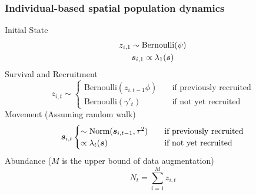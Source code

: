 \documentclass[color=usenames,dvipsnames]{beamer}\usepackage[]{graphicx}\usepackage[]{xcolor}
\begin{document}




\begin{frame}
  \frametitle{\Large Individual-based spatial population dynamics}
  {Initial State}
  \begin{gather*}
    z_{i,1} \sim \mbox{Bernoulli}(\psi) \\
    {\bm s}_{i,1} \propto \lambda_1({\bm s})
  \end{gather*}
  \vfill
  Survival and Recruitment
  \[
    z_{i,t} \sim
    \begin{cases}
      \mbox{Bernoulli}(z_{i,t-1}\phi) & \quad \text{if previously recruited} \\
      \mbox{Bernoulli}(\gamma'_t) & \quad \text{if not yet recruited} 
    \end{cases}
  \]
  \vfill
  Movement (Assuming random walk)
  \[
    \bsit %
    \begin{cases}
      \sim \mbox{Norm}(\bsitp, \tau^2) & \quad \text{if previously recruited} \\
      \propto \lambda_t(\bs) & \quad \text{if not yet recruited} 
    \end{cases}
  \]
  \vfill
  Abundance ($M$ is the upper bound of data augmentation)
  \[
    N_t = \sum_{i=1}^M z_{i,t}
  \]
\end{frame}
\end{document}
